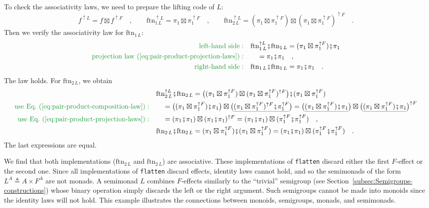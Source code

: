 To check the associativity laws, we need to prepare the lifting code
of $L$:
\[
f^{\uparrow L}=f\boxtimes f^{\uparrow F}\quad,\quad\quad\text{ftn}_{1\,L}^{\uparrow L}=\pi_{1}\boxtimes\pi_{1}^{\uparrow F}\quad,\quad\quad\text{ftn}_{2\,L}^{\uparrow L}=(\pi_{1}\boxtimes\pi_{1}^{\uparrow F})\boxtimes(\pi_{1}\boxtimes\pi_{1}^{\uparrow F})^{\uparrow F}\quad.
\]
Then we verify the associativity law for $\text{ftn}_{1\,L}$: 
\begin{align*}
{\color{greenunder}\text{left-hand side}:}\quad & \text{ftn}_{1\,L}^{\uparrow L}\bef\text{ftn}_{1\,L}=(\pi_{1}\boxtimes\pi_{1}^{\uparrow F})\bef\pi_{1}\\
{\color{greenunder}\text{projection law~(\ref{eq:pair-product-projection-laws})}:}\quad & \quad=\pi_{1}\bef\pi_{1}\quad,\\
{\color{greenunder}\text{right-hand side}:}\quad & \text{ftn}_{1\,L}\bef\text{ftn}_{1\,L}=\pi_{1}\bef\pi_{1}\quad.
\end{align*}
The law holds. For $\text{ftn}_{2\,L}$, we obtain
\begin{align*}
 & \text{ftn}_{2\,L}^{\uparrow L}\bef\text{ftn}_{2\,L}=\big((\pi_{1}\boxtimes\pi_{1}^{\uparrow F})\boxtimes(\pi_{1}\boxtimes\pi_{1}^{\uparrow F})^{\uparrow F}\big)\bef(\pi_{1}\boxtimes\pi_{1}^{\uparrow F})\\
{\color{greenunder}\text{use Eq.~(\ref{eq:pair-product-composition-law})}:}\quad & \quad=\big((\pi_{1}\boxtimes\pi_{1}^{\uparrow F})\bef\pi_{1}\big)\boxtimes\big(\gunderline{(\pi_{1}\boxtimes\pi_{1}^{\uparrow F})^{\uparrow F}\bef\pi_{1}^{\uparrow F}}\big)=\big(\gunderline{(\pi_{1}\boxtimes\pi_{1}^{\uparrow F})\bef\pi_{1}}\big)\boxtimes\big(\gunderline{(\pi_{1}\boxtimes\pi_{1}^{\uparrow F})\bef\pi_{1}}\big)^{\uparrow F}\\
{\color{greenunder}\text{use Eq.~(\ref{eq:pair-product-projection-laws})}:}\quad & \quad=(\pi_{1}\bef\pi_{1})\boxtimes(\pi_{1}\bef\pi_{1})^{\uparrow F}=(\pi_{1}\bef\pi_{1})\boxtimes(\pi_{1}^{\uparrow F}\bef\pi_{1}^{\uparrow F})\quad,\\
 & \text{ftn}_{2\,L}\bef\text{ftn}_{2\,L}=(\pi_{1}\boxtimes\pi_{1}^{\uparrow F})\bef(\pi_{1}\boxtimes\pi_{1}^{\uparrow F})=(\pi_{1}\bef\pi_{1})\boxtimes(\pi_{1}^{\uparrow F}\bef\pi_{1}^{\uparrow F})\quad.
\end{align*}
The last expressions are equal.

We find that both implementations ($\text{ftn}_{2\,L}$ and $\text{ftn}_{2\,L}$)
are associative. These implementations of \lstinline!flatten! discard
either the first $F$-effect or the second one. Since all implementations
of \lstinline!flatten! discard effects, identity laws cannot hold,
and so the semimonads of the form $L^{A}\triangleq A\times F^{A}$
are not monads. A semimonad $L$ combines $F$-effects similarly to
the \textsf{``}trivial\textsf{''} semigroup (see Section~\ref{subsec:Semigroups-constructions})
whose binary operation simply discards the left or the right argument.
Such semigroups cannot be made into monoids since the identity laws
will not hold. This example illustrates the connections between monoids,
semigroups, monads, and semimonads.

